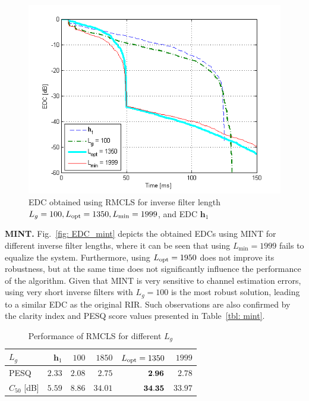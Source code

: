 \documentclass{article}
\begin{document}
\begin{figure}[t!]
\includegraphics[scale=0.6]{EUSIPCOplots/EDC_rmcls_vs_Lg_sys_5_Cm_-33}
  \vspace{-0.6cm}
\caption{EDC obtained using RMCLS for inverse filter length $L_g = 100, L_{\rm opt} = 1350, L_{\min} = 1999 $, and EDC $\mathbf{h}_1$}
\label{fig: EDC_rmcls}
\vspace{-0.56cm}
\end{figure}

\smallskip \noindent \textbf{MINT.} \enspace Fig.~\ref{fig: EDC_mint} depicts the obtained EDCs using MINT for different inverse filter lengths, where it can be seen that using $L_{\min} = 1999$ fails to equalize the system. 
Furthermore, using  $L_{\rm opt} = 1950$ does not improve its robustness, but at the same time does not significantly influence the performance of the algorithm. 
Given that MINT is very sensitive to channel estimation errors, using very short inverse filters with $L_g = 100$ is the most robust solution, leading to a similar EDC as the original RIR. 
Such observations are also confirmed by the clarity index and PESQ score values presented in Table~\ref{tbl: mint}.

\begin{table}[t!]
\footnotesize
\centering
\caption{Performance of RMCLS for different $L_g$}
\label{tbl: rmcls}
 \begin{tabular}{|l|r|r|r|r|r|}
   \hline
   $L_g$ & $\mathbf{h}_1$ & $100$ & $1850$ & $L_{\rm opt} = 1350$ & $1999$ \\ \hline
   PESQ & $2.33$ & $2.08$ & $2.75$ & $\bf{2.96}$ & $2.78$ \\ \hline
   $C_{50}$ [dB] & $5.59$ & $8.86$ & $34.01$ & $\bf{34.35}$ & $33.97$ \\ \hline
\end{tabular}
\vspace{-0.1cm}
\end{table}
\end{document}
